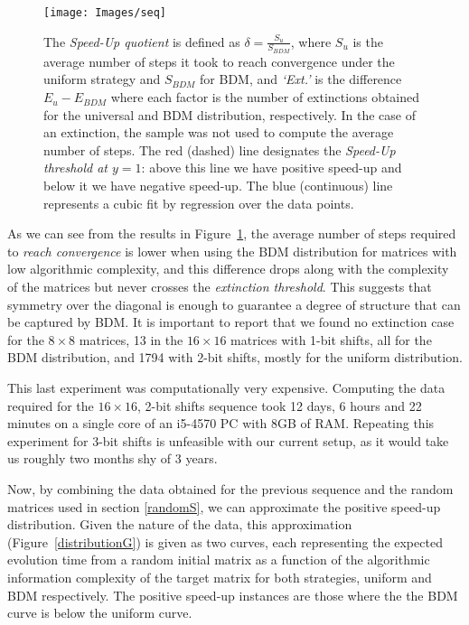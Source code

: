 \documentclass[10pt]{article}
\begin{document}
\begin{figure}[ht!]
    \centering
    \texttt{[image: Images/seq]}
    \caption{
        The
        \emph{Speed-Up quotient} is defined as
        \(\delta=\frac{S_{u}}{S_{BDM}}\), where \(S_{u}\) is the average number of
        steps it took to reach convergence under the uniform strategy and
        \(S_{BDM}\) for BDM, and \emph{`Ext.'} is the
        difference \(E_u - E_{BDM}\) where each factor is the number of
        extinctions obtained for the universal and BDM distribution,
        respectively. In the case of an extinction, the
        sample was not used to compute the average number of steps. The red (dashed) line designates the \emph{Speed-Up threshold at $y=1$}: above this line we have
        positive speed-up and below it we have negative speed-up. The blue (continuous) line represents a cubic fit by regression over the data points.
         \label{seqPlot}}
\end{figure}

As we can see from the results in Figure~\ref{seqPlot}, the average number of steps required to \textit{reach convergence} is lower when using the BDM distribution for matrices with low algorithmic complexity, and this difference drops along with the complexity of the matrices but never crosses the
\emph{extinction threshold}. This suggests that symmetry over the diagonal is enough to guarantee a degree of structure that can be captured by BDM. It is important to report that we found no
extinction case for the \(8 \times 8\) matrices, 13 in the \(16 \times 16\) matrices with 1-bit shifts, all for the BDM distribution, and 1794 with 2-bit shifts, mostly for the uniform distribution.

This last experiment was computationally very expensive. Computing the
data required for the $16 \times 16$, 2-bit shifts sequence took 12 days, 6 hours and 22 minutes on a single core of an i5-4570 PC with 8GB of RAM. Repeating this experiment for 3-bit shifts is unfeasible with our current setup, as it would take us roughly two months shy of 3 years.

Now, by combining the data obtained for the previous sequence and the random matrices used in section \ref{randomS}, we can approximate the positive speed-up distribution. Given the nature of the data, this approximation (Figure~\ref{distributionG}) is given as two curves, each representing the expected evolution time from a random initial matrix as a function of the algorithmic information complexity of the target matrix for both strategies, uniform and BDM respectively. The positive speed-up instances are those where the the BDM curve is below the uniform curve.
\end{document}
